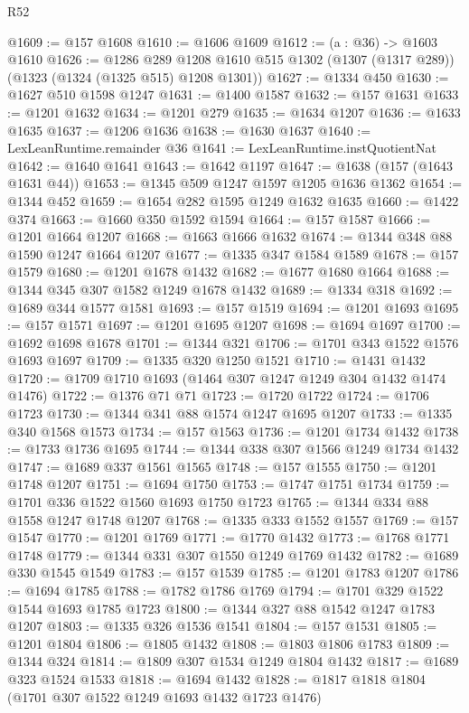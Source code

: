 \begin{lexlean}{R52}
\begin{coremodule}
@1609 := @157 @1608
@1610 := @1606 @1609
@1612 := (a : @36) -> @1603 @1610
@1626 := @1286
    @289
    @1208
    @1610
    @515
    @1302
    (@1307 (@1317 @289))
    (@1323 (@1324 (@1325 @515) @1208 @1301))
@1627 := @1334 @450
@1630 := @1627 @510 @1598 @1247
@1631 := @1400 @1587
@1632 := @157 @1631
@1633 := @1201 @1632
@1634 := @1201 @279
@1635 := @1634 @1207
@1636 := @1633 @1635
@1637 := @1206 @1636
@1638 := @1630 @1637
@1640 := LexLeanRuntime.remainder @36
@1641 := LexLeanRuntime.instQuotientNat
@1642 := @1640 @1641
@1643 := @1642 @1197
@1647 := @1638 (@157 (@1643 @1631 @44))
@1653 := @1345 @509 @1247 @1597 @1205 @1636 @1362
@1654 := @1344 @452
@1659 := @1654 @282 @1595 @1249 @1632 @1635
@1660 := @1422 @374
@1663 := @1660 @350 @1592 @1594
@1664 := @157 @1587
@1666 := @1201 @1664 @1207
@1668 := @1663 @1666 @1632
@1674 := @1344 @348 @88 @1590 @1247 @1664 @1207
@1677 := @1335 @347 @1584 @1589
@1678 := @157 @1579
@1680 := @1201 @1678 @1432
@1682 := @1677 @1680 @1664
@1688 := @1344 @345 @307 @1582 @1249 @1678 @1432
@1689 := @1334 @318
@1692 := @1689 @344 @1577 @1581
@1693 := @157 @1519
@1694 := @1201 @1693
@1695 := @157 @1571
@1697 := @1201 @1695 @1207
@1698 := @1694 @1697
@1700 := @1692 @1698 @1678
@1701 := @1344 @321
@1706 := @1701 @343 @1522 @1576 @1693 @1697
@1709 := @1335 @320 @1250 @1521
@1710 := @1431 @1432
@1720 := @1709 @1710 @1693 (@1464 @307 @1247 @1249 @304 @1432 @1474 @1476)
@1722 := @1376 @71 @71
@1723 := @1720 @1722
@1724 := @1706 @1723
@1730 := @1344 @341 @88 @1574 @1247 @1695 @1207
@1733 := @1335 @340 @1568 @1573
@1734 := @157 @1563
@1736 := @1201 @1734 @1432
@1738 := @1733 @1736 @1695
@1744 := @1344 @338 @307 @1566 @1249 @1734 @1432
@1747 := @1689 @337 @1561 @1565
@1748 := @157 @1555
@1750 := @1201 @1748 @1207
@1751 := @1694 @1750
@1753 := @1747 @1751 @1734
@1759 := @1701 @336 @1522 @1560 @1693 @1750 @1723
@1765 := @1344 @334 @88 @1558 @1247 @1748 @1207
@1768 := @1335 @333 @1552 @1557
@1769 := @157 @1547
@1770 := @1201 @1769
@1771 := @1770 @1432
@1773 := @1768 @1771 @1748
@1779 := @1344 @331 @307 @1550 @1249 @1769 @1432
@1782 := @1689 @330 @1545 @1549
@1783 := @157 @1539
@1785 := @1201 @1783 @1207
@1786 := @1694 @1785
@1788 := @1782 @1786 @1769
@1794 := @1701 @329 @1522 @1544 @1693 @1785 @1723
@1800 := @1344 @327 @88 @1542 @1247 @1783 @1207
@1803 := @1335 @326 @1536 @1541
@1804 := @157 @1531
@1805 := @1201 @1804
@1806 := @1805 @1432
@1808 := @1803 @1806 @1783
@1809 := @1344 @324
@1814 := @1809 @307 @1534 @1249 @1804 @1432
@1817 := @1689 @323 @1524 @1533
@1818 := @1694 @1432
@1828 := @1817 @1818 @1804 (@1701 @307 @1522 @1249 @1693 @1432 @1723 @1476)

\end{coremodule}
\end{lexlean}
